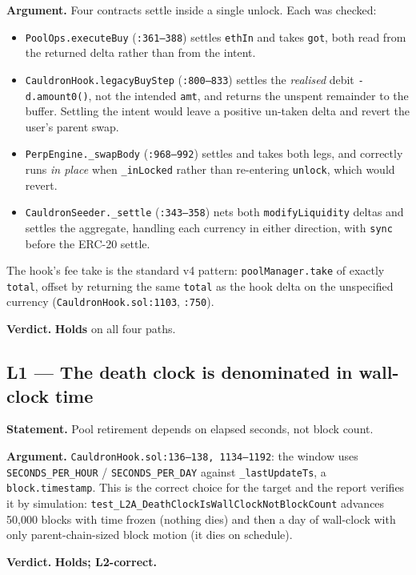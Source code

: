 \documentclass[11pt,a4paper]{article}
\newcommand{\code}[1]{\texttt{\small #1}}
\newcommand{\fileref}[1]{\texttt{\scriptsize #1}}
\begin{document}
\textbf{Argument.} Four contracts settle inside a single unlock. Each was checked:
\begin{itemize}
\item \code{PoolOps.executeBuy} (\fileref{:361--388}) settles \code{ethIn} and takes
\code{got}, both read from the returned delta rather than from the intent.
\item \code{CauldronHook.legacyBuyStep} (\fileref{:800--833}) settles the
\emph{realised} debit \code{-d.amount0()}, not the intended \code{amt}, and returns
the unspent remainder to the buffer. Settling the intent would leave a positive
un-taken delta and revert the user's parent swap.
\item \code{PerpEngine.\_swapBody} (\fileref{:968--992}) settles and takes both legs,
and correctly runs \emph{in place} when \code{\_inLocked} rather than re-entering
\code{unlock}, which would revert.
\item \code{CauldronSeeder.\_settle} (\fileref{:343--358}) nets both
\code{modifyLiquidity} deltas and settles the aggregate, handling each currency in
either direction, with \code{sync} before the ERC-20 settle.
\end{itemize}
The hook's fee take is the standard v4 pattern: \code{poolManager.take} of exactly
\code{total}, offset by returning the same \code{total} as the hook delta on the
unspecified currency (\fileref{CauldronHook.sol:1103}, \fileref{:750}).

\textbf{Verdict.} \textcolor{good}{\textbf{Holds}} on all four paths.

\subsection*{L1 --- The death clock is denominated in wall-clock time}
\textbf{Statement.} Pool retirement depends on elapsed seconds, not block count.

\textbf{Argument.} \fileref{CauldronHook.sol:136--138, 1134--1192}: the window uses
\code{SECONDS\_PER\_HOUR} / \code{SECONDS\_PER\_DAY} against \code{\_lastUpdateTs},
a \code{block.timestamp}. This is the correct choice for the target and the
report verifies it by simulation: \code{test\_L2A\_DeathClockIsWallClockNotBlockCount}
advances 50{,}000 blocks with time frozen (nothing dies) and then a day of
wall-clock with only parent-chain-sized block motion (it dies on schedule).

\textbf{Verdict.} \textcolor{good}{\textbf{Holds; L2-correct.}}
\end{document}

